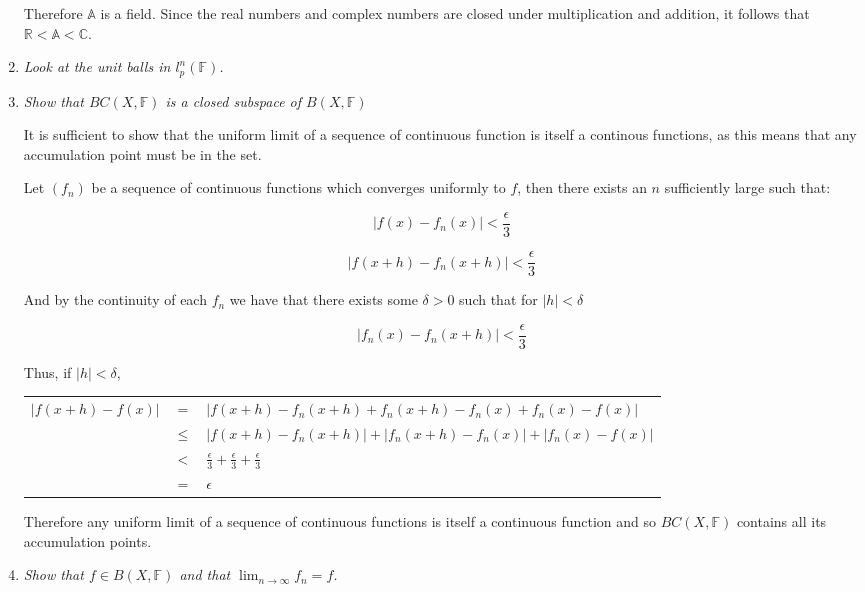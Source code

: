\documentclass[11pt]{article}
\begin{document}
\begin{enumerate}
Therefore $\mathbb{A}$ is a field.  Since the real numbers and complex numbers are closed under multiplication and addition, it follows that $\mathbb{R} < \mathbb{A} < \mathbb{C}$.

\item \emph{Look at the unit balls in $l_p^n(\mathbb{F})$.}

\item \emph{Show that $BC(X,\mathbb{F})$ is a closed subspace of $B(X,\mathbb{F})$}

It is sufficient to show that the uniform limit of a sequence of continuous function is itself a continous functions, as this means that any accumulation point must be in the set.

Let $(f_n)$ be a sequence of continuous functions which converges uniformly to $f$, then there exists an $n$ sufficiently large such that:

\begin{equation}
\label{e1}
|f(x) - f_n(x)| < \frac{\epsilon}{3}
\end{equation}

\begin{equation}
\label{e2}
|f(x+h) - f_n(x+h)| < \frac{\epsilon}{3}
\end{equation}

And by the continuity of each $f_n$ we have that there exists some $\delta > 0$ such that for $|h| < \delta$

\begin{equation}
\label{e3}
|f_n(x) - f_n(x+h)| < \frac{\epsilon}{3}
\end{equation}

Thus, if $|h| < \delta$,

\begin{tabular}{lll}
$|f(x+h) - f(x)|$ & $=$	& $|f(x+h) - f_n(x+h) + f_n(x+h) - f_n(x) + f_n(x) - f(x)|$ \\
& $\leq$ & $|f(x+h) - f_n(x+h)| + |f_n(x+h) - f_n(x)| + |f_n(x) - f(x)|$ \\
& $<$ & $\frac{\epsilon}{3} + \frac{\epsilon}{3} + \frac{\epsilon}{3}$ \\
& $=$ & $\epsilon$
\end{tabular}

Therefore any uniform limit of a sequence of continuous functions is itself a continuous function and so $BC(X,\mathbb{F})$ contains all its accumulation points.

\item \emph{Show that $f \in B(X,\mathbb{F})$ and that $\lim_{n \rightarrow \infty} f_n = f$.}


\end{enumerate}
\end{document}
